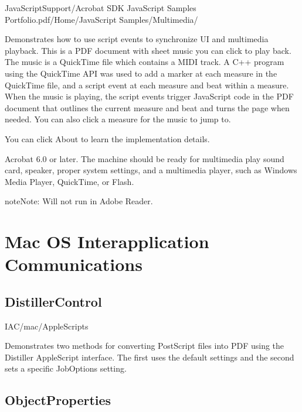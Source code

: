 \documentclass[letterpaper,12pt,english,openany,oneside]{sphinxmanual}
\begin{document}
JavaScriptSupport/Acrobat SDK JavaScript Samples Portfolio.pdf/Home/JavaScript Samples/Multimedia/

\label{\detokenize{Samples_JavaScript:description-20}}

Demonstrates how to use script events to synchronize UI and multimedia playback. This is a PDF document with sheet music you can click to play back. The music is a QuickTime file which contains a MIDI track. A C++ program using the QuickTime API was used to add a marker at each measure in the QuickTime file, and a script event at each measure and beat within a measure. When the music is playing, the script events trigger JavaScript code in the PDF document that outlines the current measure and beat and turns the page when needed. You can also click a measure for the music to jump to.

You can click About to learn the implementation details.

 Acrobat 6.0 or later. The machine should be ready for multimedia play \sphinxhyphen{} sound card, speaker, proper system settings, and a multimedia player, such as Windows Media Player, QuickTime, or Flash.

\begin{sphinxadmonition}{note}{Note:}
Will not run in Adobe Reader.
\end{sphinxadmonition}


\chapter{Mac OS \sphinxhyphen{} Interapplication Communications}
\label{\detokenize{Samples_MacintoshIAC:mac-os-interapplication-communications}}\label{\detokenize{Samples_MacintoshIAC::doc}}

\section{DistillerControl}
\label{\detokenize{Samples_MacintoshIAC:distillercontrol}}

IAC/mac/AppleScripts


Demonstrates two methods for converting PostScript files into PDF using the Distiller AppleScript interface. The first uses the default settings and the second sets a specific JobOptions setting.


\section{ObjectProperties}
\label{\detokenize{Samples_MacintoshIAC:objectproperties}}\label{\detokenize{Samples_MacintoshIAC:location-1}}
\end{document}
